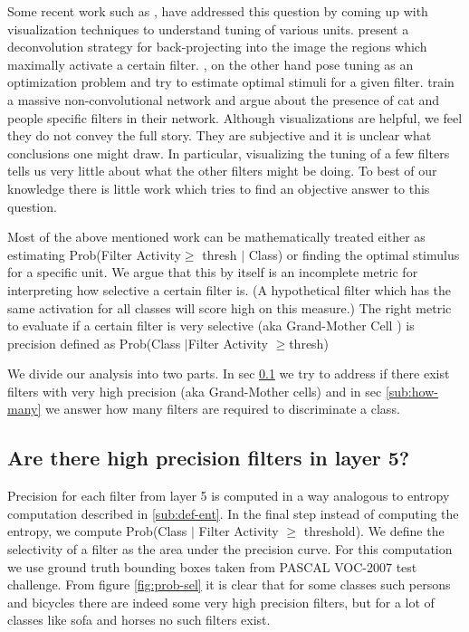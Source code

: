 \documentclass[runningheads]{llncs}
\begin{document}
Some recent work such as \cite{DeConv}, \cite{Simonyan} have addressed this question by coming up with visualization techniques to understand tuning of various units. \cite{DeConv} present a deconvolution strategy for back-projecting into the image the regions which maximally activate a certain filter.  \cite{Simonyan}, on the other hand pose tuning as an optimization problem and try to estimate optimal stimuli for a given filter. \cite{GoogleCat} train a massive non-convolutional network and argue about the presence of cat and people specific filters in their network. Although visualizations are helpful, we feel they do not convey the full story. They are subjective and it is unclear what conclusions one might draw. In particular, visualizing the tuning of a few filters tells us very little about what the other filters might be doing. To best of our knowledge there is little work which tries to find an objective answer to this question.

Most of the above mentioned work can be mathematically treated either as estimating Prob(Filter Activity$\geq$ thresh $|$ Class) or finding the optimal stimulus for a specific unit. We argue that this by itself is an incomplete metric for interpreting how selective a certain filter is. (A hypothetical filter which has the same activation for all classes will score high on this measure.)  The right metric to evaluate if a certain filter is very selective (aka Grand-Mother Cell \cite{Barlow}) is precision defined as Prob(Class $|$Filter Activity $\geq$thresh)

We divide our analysis into two parts. In sec \ref{sub:class-specific-unit} we try to address if there exist filters with very high precision (aka Grand-Mother cells) and in sec \ref{sub:how-many} we answer how many filters are required to discriminate a class. 

\subsection{Are there high precision filters in layer 5?}
\label{sub:class-specific-unit}
Precision for each filter from layer 5 is computed in a way analogous to entropy computation described in \ref{sub:def-ent}. In the final step instead of computing the entropy, we compute Prob(Class $|$ Filter Activity $\geq$ threshold). We define the selectivity of a filter as the area under the precision curve. For this computation we use ground truth bounding boxes taken from PASCAL VOC-2007 test challenge.
From figure \ref{fig:prob-sel} it is clear that for some classes such persons and bicycles there are indeed some very high precision filters, but for a lot of classes like sofa and horses no such filters exist. 
\end{document}
